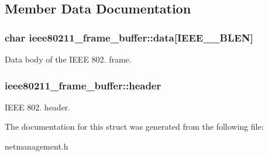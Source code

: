 \subsection{\-Member \-Data \-Documentation}
\hypertarget{structieee80211__frame__buffer_a8606b935b67137224596a96da05f532c}{
\subsubsection[{data}]{\setlength{\rightskip}{0pt plus 5cm}char {\bf ieee80211\-\_\-frame\-\_\-buffer\-::data}\mbox{[}\-I\-E\-E\-E\-\_\-\_\-\-B\-L\-E\-N\mbox{]}}}\label{structieee80211__frame__buffer_a8606b935b67137224596a96da05f532c}
\-Data body of the \-I\-E\-E\-E 802. frame. \hypertarget{structieee80211__frame__buffer_ac60e3de25c452f9f6732fab6de4611b6}{
\subsubsection[{header}]{ {\bf ieee80211\-\_\-frame\-\_\-buffer\-::header}}}\label{structieee80211__frame__buffer_ac60e3de25c452f9f6732fab6de4611b6}
\-I\-E\-E\-E 802. header. 

\-The documentation for this struct was generated from the following file\-:\begin{DoxyCompactItemize}
\item 
netmanagement.\-h\end{DoxyCompactItemize}
